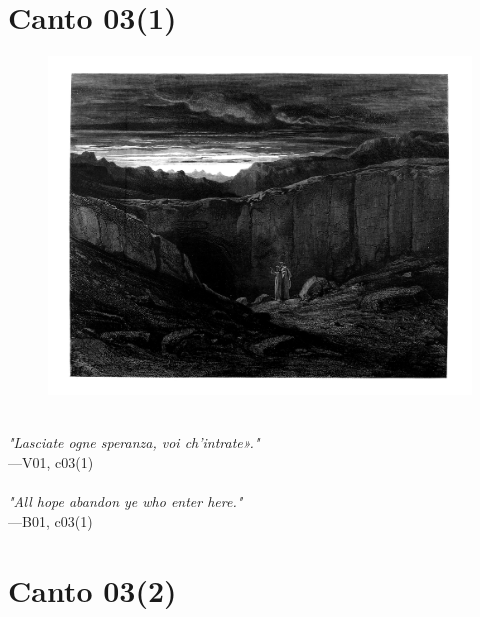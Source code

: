 \documentclass[../Dore_vision.tex]{subfiles}
\begin{document}
\newpage

\section{Canto 03(1)}

\begin{figure}[ht]
\centering
\includegraphics[height=\figsize]{illustrations/book_1/V01, c03(1).jpg}
\end{figure}

\begin{center}
\begin{minipage}{0.8\linewidth}
\textit{\\
"Lasciate ogne speranza, voi ch’intrate»."} \\
—V01, c03(1) \\~\\
\textit{"All hope abandon ye who enter here.\textquotesingle"} \\
—B01, c03(1)
\end{minipage}
\end{center}

\newpage

\section{Canto 03(2)}
\end{document}
